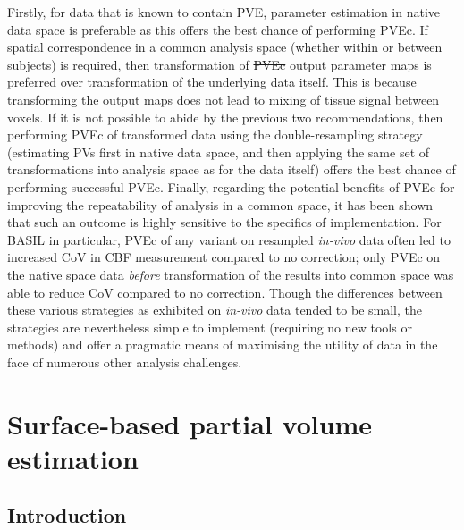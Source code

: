 \documentclass[12pt]{report}
\providecommand{\DIFaddtex}[1]{{\protect\color{blue}\uwave{#1}}} %
\providecommand{\DIFdeltex}[1]{{\protect\color{red}\sout{#1}}}                      %
\providecommand{\DIFaddbegin}{} %
\providecommand{\DIFaddend}{} %
\providecommand{\DIFdelbegin}{} %
\providecommand{\DIFdelend}{} %
\providecommand{\DIFadd}[1]{\texorpdfstring{\DIFaddtex{#1}}{#1}} %
\providecommand{\DIFdel}[1]{\texorpdfstring{\DIFdeltex{#1}}{}} %
\newcommand{\DIFscaledelfig}{0.5}
\newlength{\DIFdelgraphicswidth} %
\newlength{\DIFdelgraphicsheight} %
\newcommand{\DIFaddincludegraphics}[2][]{{\color{blue}\fbox{\DIFOincludegraphics[#1]{#2}}}} %
\newcommand{\DIFdelincludegraphics}[2][]{%
\sbox{\DIFdelgraphicsbox}{\DIFOincludegraphics[#1]{#2}}%
\settoboxwidth{\DIFdelgraphicswidth}{\DIFdelgraphicsbox} %
\settoboxtotalheight{\DIFdelgraphicsheight}{\DIFdelgraphicsbox} %
\scalebox{\DIFscaledelfig}{%
\parbox[b]{\DIFdelgraphicswidth}{\usebox{\DIFdelgraphicsbox}\\[-\baselineskip] \rule{\DIFdelgraphicswidth}{0em}}\llap{\resizebox{\DIFdelgraphicswidth}{\DIFdelgraphicsheight}{%
\setlength{\unitlength}{\DIFdelgraphicswidth}%
\begin{picture}(1,1)%
\thicklines\linethickness{2pt} %
{\color[rgb]{1,0,0}\put(0,0){\framebox(1,1){}}}%
{\color[rgb]{1,0,0}\put(0,0){\line( 1,1){1}}}%
{\color[rgb]{1,0,0}\put(0,1){\line(1,-1){1}}}%
\end{picture}%
}\hspace*{3pt}}} %
} %
\DeclareRobustCommand{\DIFaddbegin}{\DIFOaddbegin \let\includegraphics\DIFaddincludegraphics} %
\DeclareRobustCommand{\DIFaddend}{\DIFOaddend \let\includegraphics\DIFOincludegraphics} %
\DeclareRobustCommand{\DIFdelbegin}{\DIFOdelbegin \let\includegraphics\DIFdelincludegraphics} %
\DeclareRobustCommand{\DIFdelend}{\DIFOaddend \let\includegraphics\DIFOincludegraphics} %
\begin{document}
Firstly, for data that is known to contain PVE, parameter estimation in native data space is preferable as this offers the best chance of performing PVEc. If spatial correspondence in a common analysis space (whether within or between subjects) is required, then transformation of \DIFdelbegin \DIFdel{PVEc }\DIFdelend \DIFaddbegin \DIFadd{PVE corrected }\DIFaddend output parameter maps is preferred over transformation of the underlying data itself. This is because transforming the output maps does not lead to mixing of tissue signal between voxels. If it is not possible to abide by the previous two recommendations, then performing PVEc of transformed data using the double-resampling strategy (estimating PVs first in native data space, and then applying the same set of transformations into analysis space as for the data itself) offers the best chance of performing successful PVEc. Finally, regarding the potential benefits of PVEc for improving the repeatability of analysis in a common space, it has been shown that such an outcome is highly sensitive to the specifics of implementation. For BASIL in particular, PVEc of any variant on resampled \textit{in-vivo} data often led to increased CoV in CBF measurement compared to no correction; only PVEc on the native space data \textit{before} transformation of the results into common space was able to reduce CoV compared to no correction. Though the differences between these various strategies as exhibited on \textit{in-vivo} data tended to be small, the strategies are nevertheless simple to implement (requiring no new tools or methods) and offer a pragmatic means of maximising the utility of data in the face of numerous other analysis challenges. 

 \newpage 
 \newpage %


\chapter[Surface-based PV estimation]{Surface-based partial volume estimation}
\label{tob_pv_chapter}

\section{Introduction}
\end{document}

